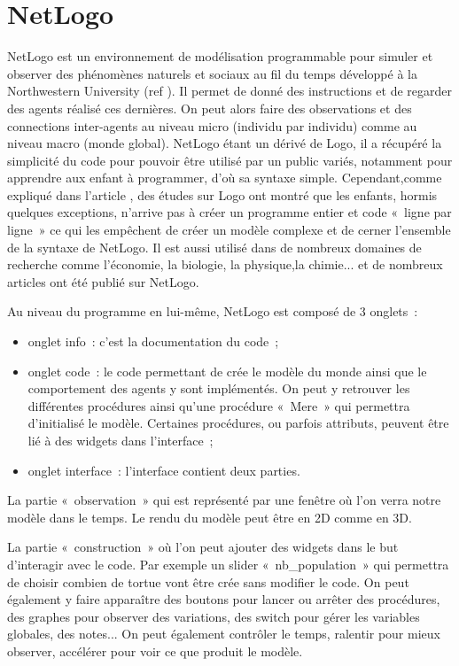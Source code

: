 \section{NetLogo}
\label{NetLogo}

NetLogo est un environnement de modélisation programmable pour simuler et observer des phénomènes naturels et sociaux au fil du temps développé à la Northwestern University (ref \cite{netlogo}). Il permet de donné des instructions et de regarder des agents réalisé ces dernières. On peut alors faire des observations et des connections inter-agents au niveau micro (individu par individu) comme au niveau macro (monde global).
NetLogo étant un dérivé de Logo, il a récupéré la simplicité du code pour pouvoir être utilisé par un public variés, notamment pour apprendre aux enfant à programmer, d'où sa syntaxe simple. Cependant,comme expliqué dans l'article \cite{Logo}, des études sur Logo ont montré que les enfants, hormis quelques exceptions, n'arrive pas à créer un programme entier et code «~ligne par ligne~» ce qui les empêchent de créer un modèle complexe et de cerner l'ensemble de la syntaxe de NetLogo.
Il est aussi utilisé dans de nombreux domaines de recherche comme l'économie, la biologie, la physique,la chimie... et de nombreux articles ont été publié sur NetLogo.

Au niveau du programme en lui-même, NetLogo est composé de 3 onglets~: 
\begin{itemize}
	\item onglet info~: c'est la documentation du code~;
	\item onglet code~: le code permettant de crée le modèle du monde ainsi que le comportement des agents y sont implémentés. On peut y retrouver les différentes procédures ainsi qu'une procédure «~Mere~» qui permettra d'initialisé le modèle. Certaines procédures, ou parfois attributs, peuvent être lié à des widgets dans l'interface~;
	\item onglet interface~: l'interface contient deux parties.
\end{itemize}

La partie «~observation~» qui est représenté par une fenêtre où l'on verra notre modèle dans le temps. Le rendu du modèle peut être en 2D comme en 3D.

La partie «~construction~» où l'on peut ajouter des widgets dans le but d’interagir avec le code. Par exemple un slider «~nb\_population~» qui permettra de choisir combien de tortue vont être crée sans modifier le code. On peut également y faire apparaître des boutons pour lancer ou arrêter des procédures, des graphes pour observer des variations, des switch pour gérer les variables globales, des notes... On peut également contrôler le temps, ralentir pour mieux observer, accélérer pour voir ce que produit le modèle.


